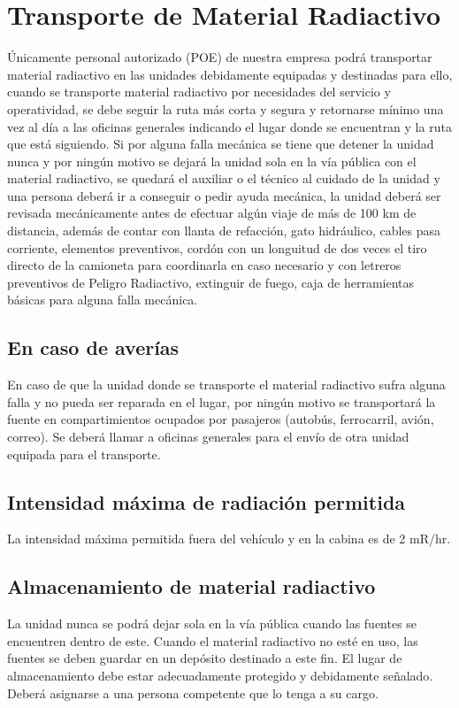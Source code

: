 \section*{Transporte de Material Radiactivo}

Únicamente personal autorizado (POE) de nuestra empresa podrá transportar material radiactivo en las unidades debidamente equipadas y destinadas para ello, cuando se transporte material radiactivo por necesidades del servicio y operatividad, se debe seguir la ruta más corta y segura y retornarse mínimo una vez al día a las oficinas generales indicando el lugar donde se encuentran y la ruta que está siguiendo. Si por alguna falla mecánica se tiene que detener la unidad nunca y por ningún motivo se dejará la unidad sola en la vía pública con el material radiactivo, se quedará el auxiliar o el técnico al cuidado de la unidad y una persona deberá ir a conseguir o pedir ayuda mecánica, la unidad deberá ser revisada mecánicamente antes de efectuar algún viaje de más de 100 km de distancia, además de contar con llanta de refacción, gato hidráulico, cables pasa corriente, elementos preventivos, cordón con un longuitud de dos veces el tiro directo de la camioneta para coordinarla en caso necesario y con letreros preventivos de Peligro Radiactivo, extinguir de fuego, caja de herramientas básicas para alguna falla mecánica.

\subsection*{En caso de averías}
En caso de que la unidad donde se transporte el material radiactivo sufra alguna falla y no pueda ser reparada en el lugar, por ningún motivo se transportará la fuente en compartimientos ocupados por pasajeros (autobús, ferrocarril, avión, correo). Se deberá llamar a oficinas generales para el envío de otra unidad equipada para el transporte.

\subsection*{Intensidad máxima de radiación permitida}
La intensidad máxima permitida fuera del vehículo y en la cabina es de 2 mR/hr.

\subsection*{Almacenamiento de material radiactivo}
La unidad nunca se podrá dejar sola en la vía pública cuando las fuentes se encuentren dentro de este.
Cuando el material radiactivo no esté en uso, las fuentes se deben guardar en un depósito destinado a este fin. El lugar de almacenamiento debe estar adecuadamente protegido y debidamente señalado. Deberá asignarse a una persona competente que lo tenga a su cargo.

